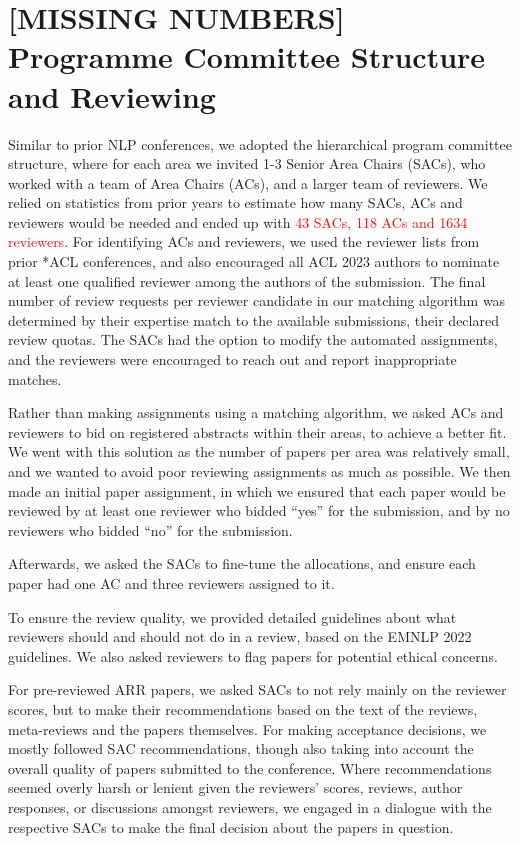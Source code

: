 \section*{[MISSING NUMBERS] Programme Committee Structure and Reviewing}
Similar to prior NLP conferences, we adopted the hierarchical program committee structure, where for each area we invited 1-3 Senior Area Chairs (SACs), who worked with a team of Area Chairs (ACs), and a larger team of reviewers. We relied on statistics from prior years to estimate how many SACs, ACs and reviewers would be needed and ended up with \textcolor{red}{43 SACs, 118 ACs and 1634 reviewers}. For identifying ACs and reviewers, we used the reviewer lists from prior *ACL conferences, and also encouraged all ACL 2023 authors to nominate at least one qualified reviewer among the authors of the submission. The final number of review requests per reviewer candidate in our matching algorithm was determined by their expertise match to the available submissions, their declared review quotas. The SACs had the option to modify the automated assignments, and the reviewers were encouraged to reach out and report inappropriate matches.



Rather than making assignments using a matching algorithm, we asked ACs and reviewers to bid on registered abstracts within their areas, to achieve a better fit. We went with this solution as the number of papers per area was relatively small, and we wanted to avoid poor reviewing assignments as much as possible. We then made an initial paper assignment, in which we ensured that each paper would be reviewed by at least one reviewer who bidded “yes” for the submission, and by no reviewers who bidded “no” for the submission.

Afterwards, we asked the SACs to fine-tune the allocations, and ensure each paper had one AC and three reviewers assigned to it. 

To ensure the review quality, we provided detailed guidelines about what reviewers should and should not do in a review, based on the EMNLP 2022 guidelines. We also asked reviewers to flag papers for potential ethical concerns.

For pre-reviewed ARR papers, we asked SACs to not rely mainly on the reviewer scores, but to make their recommendations based on the text of the reviews, meta-reviews and the papers themselves. For making acceptance decisions, we mostly followed SAC recommendations, though also taking into account the overall quality of papers submitted to the conference. Where recommendations seemed overly harsh or lenient given the reviewers' scores, reviews, author responses, or discussions amongst reviewers, we engaged in a dialogue with the respective SACs to make the final decision about the papers in question.

